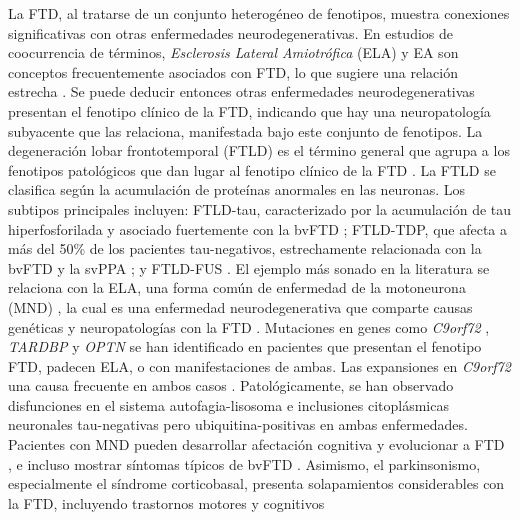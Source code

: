 La FTD, al tratarse de un conjunto heterogéneo de fenotipos, muestra conexiones significativas con otras enfermedades neurodegenerativas. En estudios de coocurrencia de términos, \textit{Esclerosis Lateral Amiotrófica} (ELA) y EA son conceptos frecuentemente asociados con FTD, lo que sugiere una relación estrecha \cite{fneur.2024.1399600}. %
Se puede deducir entonces otras enfermedades neurodegenerativas presentan el fenotipo clínico de la FTD, indicando que hay una neuropatología subyacente que las relaciona, manifestada bajo este conjunto de fenotipos. La degeneración lobar frontotemporal (FTLD) es el término general que agrupa a los fenotipos patológicos que dan lugar al fenotipo clínico de la FTD \cite{neary1998frontotemporal}. La FTLD se clasifica según la acumulación de proteínas anormales en las neuronas. Los subtipos principales incluyen: FTLD-tau, caracterizado por la acumulación de tau hiperfosforilada y asociado fuertemente con la bvFTD \cite{mackenzie2010tau}; FTLD-TDP, que afecta a más del 50\% de los pacientes tau-negativos, estrechamente relacionada con la bvFTD y la svPPA \cite{mackenzie2008atypical}; y FTLD-FUS \cite{mackenzie2010tdp}. %
El ejemplo más sonado en la literatura se relaciona con la ELA, una forma común de enfermedad de la motoneurona (MND) \cite{NHS_MND}, la cual es una enfermedad neurodegenerativa que comparte causas genéticas y neuropatologías con la FTD \cite{10.1093/brain/awr195}. Mutaciones en genes como \textit{C9orf72} \cite{DeJesusHernandez2011}, \textit{TARDBP} \cite{Arai2006} y \textit{OPTN} \cite{Bussi2018} se han identificado en pacientes que presentan el fenotipo FTD, padecen ELA, o con manifestaciones de ambas.  Las expansiones en \textit{C9orf72} una causa frecuente en ambos casos \cite{Balendra2018, DeJesusHernandez2011}. Patológicamente, se han observado disfunciones en el sistema autofagia-lisosoma \cite{Casterton2020} e inclusiones citoplásmicas neuronales tau-negativas pero ubiquitina-positivas \cite{Arai2006} en ambas enfermedades. Pacientes con MND pueden desarrollar afectación cognitiva y evolucionar a FTD \cite{Devenney2015}, e incluso mostrar síntomas típicos de bvFTD \cite{Devenney2019}. Asimismo, el parkinsonismo, especialmente el síndrome corticobasal, presenta solapamientos considerables con la FTD, incluyendo trastornos motores y cognitivos \cite{Orphanet_MND}

